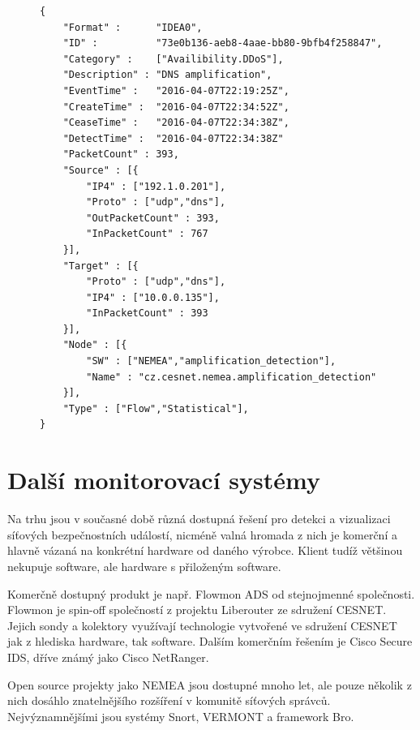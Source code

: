 \begin{figure}[h]
\lstset{basicstyle=\small,style=JSON}
\begin{lstlisting}
{
    "Format" :      "IDEA0",
    "ID" :          "73e0b136-aeb8-4aae-bb80-9bfb4f258847",
    "Category" :    ["Availibility.DDoS"],
    "Description" : "DNS amplification",
    "EventTime" :   "2016-04-07T22:19:25Z",
    "CreateTime" :  "2016-04-07T22:34:52Z",
    "CeaseTime" :   "2016-04-07T22:34:38Z",
    "DetectTime" :  "2016-04-07T22:34:38Z"
    "PacketCount" : 393,
    "Source" : [{
        "IP4" : ["192.1.0.201"],
        "Proto" : ["udp","dns"],
        "OutPacketCount" : 393,
        "InPacketCount" : 767
    }],
    "Target" : [{
        "Proto" : ["udp","dns"],
        "IP4" : ["10.0.0.135"],
        "InPacketCount" : 393
    }],
    "Node" : [{
        "SW" : ["NEMEA","amplification_detection"],
        "Name" : "cz.cesnet.nemea.amplification_detection"
    }],
    "Type" : ["Flow","Statistical"],
}
\end{lstlisting}
\label{code:idea}
\end{figure}

\newpage

\section{Další monitorovací systémy}

Na trhu jsou v současné době různá dostupná řešení pro detekci a vizualizaci síťových bezpečnostních událostí, nicméně valná hromada z nich je komerční a hlavně vázaná na konkrétní hardware od daného výrobce. Klient tudíž většinou nekupuje software, ale hardware s přiloženým software.

Komerčně dostupný produkt je např. Flowmon\cite{flowmon:report} ADS\cite{flowmon:ads} od stejnojmenné společnosti. Flowmon je spin-off společností z projektu Liberouter ze sdružení CESNET. Jejich sondy a kolektory využívají technologie vytvořené ve sdružení CESNET jak z hlediska hardware, tak software. Dalším komerčním řešením je Cisco Secure IDS\cite{cisco:ids}, dříve známý jako Cisco NetRanger.

Open source projekty jako NEMEA jsou dostupné mnoho let, ale pouze několik z nich dosáhlo znatelnějšího rozšíření v komunitě síťových správců. Nejvýznamnějšími jsou systémy Snort\cite{snort}, VERMONT\cite{vermont} a framework Bro\cite{bro}. 


